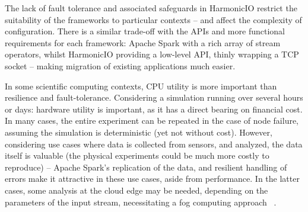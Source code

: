 \documentclass[conference]{IEEEtran}
\begin{document}
The lack of fault tolerance and associated safeguards in HarmonicIO restrict the suitability of the frameworks to particular contexts -- and affect the complexity of configuration. There is a similar trade-off with the APIs and more functional requirements for each framework: Apache Spark with a rich array of stream operators, whilst HarmonicIO providing a low-level API, thinly wrapping a TCP socket -- making migration of existing applications much easier.

In some scientific computing contexts, CPU utility is more important than resilience and fault-tolerance. Considering a simulation running  over several hours or days: hardware utility is important, as it has a direct bearing on financial cost. In many cases, the entire experiment can be repeated in the case of node failure, assuming the simulation is deterministic (yet not without cost). However, considering use cases where data is collected from sensors, and analyzed, the data itself is valuable (the physical experiments could be much more costly to reproduce) -- Apache Spark's replication of the data, and resilient handling of errors make it attractive in these use cases, aside from performance. In the latter cases, some analysis at the cloud edge may be needed, depending on the parameters of the input stream, necessitating a fog computing approach ~\cite{bonomiFogComputingIts2012}. 
\end{document}

